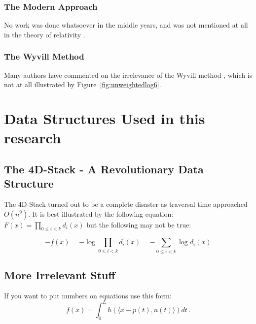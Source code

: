 \documentclass[11pt]{report}
\begin{document}
\subsection{The Modern Approach}
No work was done whatsoever in the middle years, and was not mentioned at all in the theory of relativity \cite{einstein}.

\subsection{The Wyvill Method}
Many authors have commented on the irrelevance of the Wyvill method \cite{Wyvill:1999p149}, which
is not at all illustrated by Figure~\ref{fig:unweightedlog6}.

\chapter{Data Structures Used in this research}
\section{The 4D-Stack - A Revolutionary Data Structure}
The 4D-Stack turned out to be a complete disaster as traversal time approached $O(n^9).$
It is best illustrated by the following equation: $F(x) = \prod_{0\leq i<k}d_i(x)$
but the following may not be true:

\[
-f(x) = - \log \prod_{0\leq i<k}d_i(x) = - \sum_{0\leq i<k} \log d_i(x)
\]


\section{More Irrelevant Stuff}
If you want to put numbers on equations use this form:
\begin{equation}
\label{integralrep}
f(x)=\int_0^L h( \langle x-p(t),n(t) \rangle ) dt\,.
\end{equation}
\end{document}
